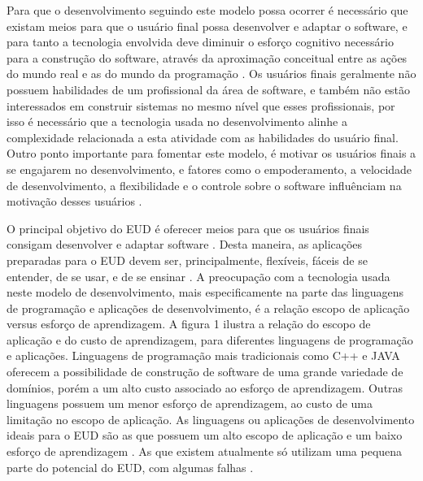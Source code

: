 Para que o desenvolvimento seguindo este modelo possa ocorrer é necessário que existam meios para que o usuário final possa desenvolver e adaptar o software, e para tanto a tecnologia envolvida deve diminuir o esforço cognitivo necessário para a construção do software, através da aproximação conceitual entre as ações do mundo real e as do mundo da programação \cite{fischer2004}. Os usuários finais geralmente não possuem habilidades de um profissional da área de software, e também não estão interessados em construir sistemas no mesmo nível que esses profissionais, por isso é necessário que a tecnologia usada no desenvolvimento alinhe a complexidade relacionada a esta atividade com as habilidades do usuário final. Outro ponto importante para fomentar este modelo, é motivar os usuários finais a se engajarem no desenvolvimento, e fatores como o empoderamento, a velocidade de desenvolvimento, a flexibilidade e o controle sobre o software influênciam na motivação desses usuários \cite{fischer2004}. 

O principal objetivo do EUD é oferecer meios para que os usuários finais consigam desenvolver e adaptar software \cite{lieberman2006}. Desta maneira, as aplicações preparadas para o EUD devem ser, principalmente, flexíveis, fáceis de se entender, de se usar, e de se ensinar \cite{lieberman2006}. A preocupação com a tecnologia usada neste modelo de desenvolvimento, mais especificamente na parte das linguagens de programação e aplicações de desenvolvimento, é a relação escopo de aplicação versus esforço de aprendizagem. A figura 1 ilustra a relação do escopo de aplicação e do custo de aprendizagem, para diferentes linguagens de programação e aplicações. Linguagens de programação mais tradicionais como C++ e JAVA oferecem a possibilidade de construção de software de uma grande variedade de domínios, porém a um alto custo associado ao esforço de aprendizagem. Outras linguagens possuem um menor esforço de aprendizagem, ao custo de uma limitação no escopo de aplicação. As linguagens ou aplicações de desenvolvimento ideais para o EUD são as que possuem um alto escopo de aplicação e um baixo esforço de aprendizagem \cite{fischer2004}. As que existem atualmente só utilizam uma pequena parte do potencial do EUD, com algumas falhas \cite{paterno2013}.


